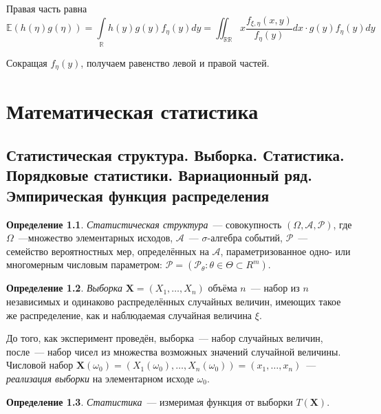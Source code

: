 \documentclass[oneside,final,14pt]{extreport}
\theoremstyle{plain}
\theoremstyle{definition}
\newtheorem*{defn}{Определение}
\theoremstyle{named}
\begin{document}
    Правая часть равна
    \begin{equation*}
        \mathbb{E}(h(\eta) g(\eta))=\int\limits_{\mathbb{R}} h(y) g(y) f_{\eta}(y) d y=\iint_{\mathbb{R} \mathbb{R}} x \frac{f_{\xi, \eta}(x, y)}{f_{\eta}(y)} d x \cdot g(y) f_{\eta}(y) d y
    \end{equation*}
    
    Сокращая $f_{\eta}(y)$, получаем равенство левой и правой частей.

\chapter{Математическая статистика}

\section{Статистическая структура. Выборка. Статистика. Порядковые статистики. Вариационный ряд. Эмпирическая функция распределения}

\begin{defn}
{\it Статистическая структура}~--- совокупность $(\Omega, \mathcal{A}, \mathcal{P})$, где $\Omega$~---множество элементарных исходов, $\mathcal{A}$~--- $\sigma$-алгебра событий, $\mathcal{P}$~--- семейство вероятностных мер, определённых на $\mathcal{A}$, параметризованное одно- или многомерным числовым параметром: $\mathcal{P} = (\mathcal{P}_{\theta}:\theta \in \Theta \subset R^{m})$.
\end{defn}

\begin{defn}
{\it Выборка} $\mathbf{X} = (X_{1}, \ldots, X_{n})$ объёма $n$~--- набор из $n$ независимых и одинаково распределённых случайных величин, имеющих такое же распределение, как и наблюдаемая случайная величина $\xi$.

\end{defn}

До того, как эксперимент проведён, выборка~--- набор случайных величин, после~--- набор чисел из множества возможных значений случайной величины. Числовой набор $\mathbf{X}(\omega_0) = (X_{1}(\omega_0), \ldots, X_{n}(\omega_0)) = (x_1, \ldots, x_n)$~--- {\it реализация выборки} на элементарном исходе $\omega_0$.

\begin{defn}
{\it Статистика}~--- измеримая функция от выборки $T(\mathbf{X})$.
\end{defn}
\end{document}
